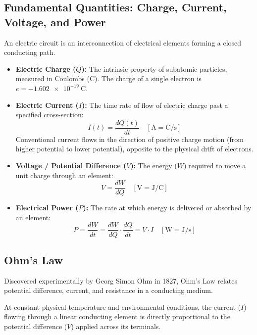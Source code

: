 \subsection{Fundamental Quantities: Charge, Current, Voltage, and Power}
An electric circuit is an interconnection of electrical elements forming a closed conducting path.
\begin{itemize}
    \item \textbf{Electric Charge ($Q$):} The intrinsic property of subatomic particles, measured in Coulombs ($\si{\coulomb}$). The charge of a single electron is $e = \SI{-1.602e-19}{\coulomb}$.
    \item \textbf{Electric Current ($I$):} The time rate of flow of electric charge past a specified cross-section:
    \begin{equation}
        I(t) = \frac{dQ(t)}{dt} \quad [\si{\ampere} = \si{\coulomb\per\second}]
    \end{equation}
    Conventional current flows in the direction of positive charge motion (from higher potential to lower potential), opposite to the physical drift of electrons.
    \item \textbf{Voltage / Potential Difference ($V$):} The energy ($W$) required to move a unit charge through an element:
    \begin{equation}
        V = \frac{dW}{dQ} \quad [\si{\volt} = \si{\joule\per\coulomb}]
    \end{equation}
    \item \textbf{Electrical Power ($P$):} The rate at which energy is delivered or absorbed by an element:
    \begin{equation}
        P = \frac{dW}{dt} = \frac{dW}{dQ} \cdot \frac{dQ}{dt} = V \cdot I \quad [\si{\watt} = \si{\joule\per\second}]
    \end{equation}
\end{itemize}

\subsection{Ohm's Law}
Discovered experimentally by Georg Simon Ohm in 1827, Ohm's Law relates potential difference, current, and resistance in a conducting medium.

\begin{definition}
At constant physical temperature and environmental conditions, the current ($I$) flowing through a linear conducting element is directly proportional to the potential difference ($V$) applied across its terminals.
\end{definition}

